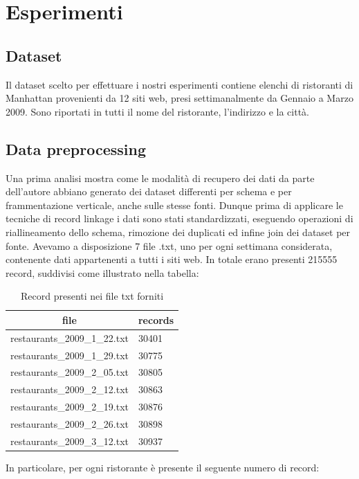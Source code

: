 \documentclass[a4paper,12pt]{article}
\begin{document}
\section{Esperimenti}
\subsection{Dataset}
Il dataset scelto per effettuare i nostri esperimenti contiene elenchi di ristoranti di Manhattan provenienti da 12 siti web, presi settimanalmente da Gennaio a Marzo 2009. Sono riportati in tutti il nome del ristorante, l'indirizzo e la città.

\subsection{Data preprocessing}
Una prima analisi mostra come le modalità di recupero dei dati da parte dell'autore abbiano generato dei dataset differenti per schema e per frammentazione verticale, anche sulle stesse fonti. Dunque prima di applicare le tecniche di record linkage i dati sono stati standardizzati, eseguendo operazioni di riallineamento dello schema, rimozione dei duplicati ed infine join dei dataset per fonte. Avevamo a disposizione 7 file .txt, uno per ogni settimana considerata, contenente dati appartenenti a tutti i siti web. In totale erano presenti 215555 record, suddivisi come illustrato nella tabella:
\begin{table}[H] \centering
\begin{tabular}{|l|l|}
\hline
\multicolumn{1}{|c|}{\textbf{file}} & \multicolumn{1}{c|}{\textbf{records}} \\ \hline
restaurants\_2009\_1\_22.txt & 30401 \\ \hline
restaurants\_2009\_1\_29.txt & 30775 \\ \hline
restaurants\_2009\_2\_05.txt & 30805 \\ \hline
restaurants\_2009\_2\_12.txt & 30863 \\ \hline
restaurants\_2009\_2\_19.txt & 30876 \\ \hline
restaurants\_2009\_2\_26.txt & 30898 \\ \hline
restaurants\_2009\_3\_12.txt & 30937 \\ \hline
\end{tabular}
\caption{Record presenti nei file txt forniti}
\label{tab:Tab}
\end{table}

In particolare, per ogni ristorante è presente il seguente numero di record:
\end{document}
